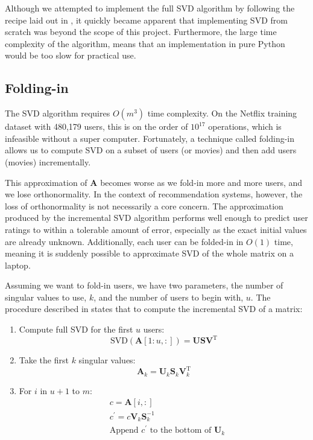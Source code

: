 \documentclass{article} %
\newcommand{\A}{\mathbf{A}}
\newcommand{\T}{\textrm{T}}
\begin{document}
Although we attempted to implement the full SVD algorithm by following the recipe laid out in \cite{recipes2007}, it quickly became apparent that implementing SVD from scratch was beyond the scope of this project.
Furthermore, the large time complexity of the algorithm, means that an implementation in pure Python would be too slow for practical use.

\subsection{Folding-in}
The SVD algorithm requires $O(m^3)$ time complexity.
On the Netflix training dataset with 480,179 users, this is on the order of $10^{17}$ operations, which is infeasible without a super computer.
Fortunately, a technique called folding-in allows us to compute SVD on a subset of users (or movies) and then add users (movies) incrementally.

This approximation of $\A$ becomes worse as we fold-in more and more users, and we lose orthonormality.
In the context of recommendation systems, however, the loss of orthonormality is not necessarily a core concern.
The approximation produced by the incremental SVD algorithm performs well enough to predict user ratings to within a tolerable amount of error, especially as the exact initial values are already unknown.
Additionally, each user can be folded-in in $O(1)$ time, meaning it is suddenly possible to approximate SVD of the whole matrix on a laptop.

Assuming we want to fold-in users, we have two parameters, the number of singular values to use, $k$, and the number of users to begin with, $u$.
The procedure described in \cite{slides} states that to compute the incremental SVD of a matrix:

\begin{enumerate}
\item Compute full SVD for the first $u$ users:
$$\textrm{SVD}(\A[1:u,:]) = \mathbf{U}\mathbf{S}\mathbf{V}^{\T}$$
\item Take the first $k$ singular values:
$$\A_k= \mathbf{U}_k\mathbf{S}_k\mathbf{V}_k^{\T}$$
\item For $i$ in $u+1$ to $m$:
\begin{align*}
&c = \A[i,:]\\
&c^{\prime} = c \mathbf{V}_k \mathbf{S}_k^{-1}\\
&\textrm{Append $c^{\prime}$ to the bottom of $\mathbf{U}_k$}
\end{align*}
\end{enumerate}
\end{document}
